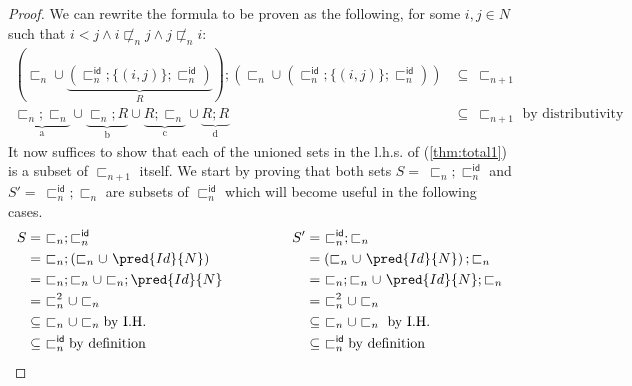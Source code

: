 \begin{lem}
{\begin{proof}
	We can rewrite the formula to be proven as the following, for some $i, j \in N$ such that $i < j \land i \not\sqsubset_n j \land j \not\sqsubset_n i$:
	\begin{align}
		\left( \sqsubset_n \cup \underbrace{\left( \sqsubset_n^\mathsf{id} ; \{ (i, j) \} ; \sqsubset_n^\mathsf{id} \right)}_{R} \right) ; \left( \sqsubset_n \cup \left( \sqsubset_n^\mathsf{id} ; \{ (i, j) \} ; \sqsubset_n^\mathsf{id} \right) \right) &\subseteq\ \sqsubset_{n + 1} \\
		\label{thm:total1}
		\underbrace{\sqsubset_n ; \sqsubset_n}_{\text{a}}
			\cup
		\underbrace{\sqsubset_n ; R}_{\text{b}}
			\cup
		\underbrace{R ; \sqsubset_n}_{\text{c}}
			\cup
		\underbrace{R ; R}_{\text{d}}
			&\subseteq\ \sqsubset_{n + 1} \text{ by distributivity}
	\end{align}
	It now suffices to show that each of the unioned sets in the l.h.s. of (\ref{thm:total1}) is a subset of $\sqsubset_{n + 1}$ itself. We start by proving that both sets $S =\ \sqsubset_n ; \sqsubset_n^\mathsf{id}$ and $S' =\ \sqsubset_n^\mathsf{id} ; \sqsubset_n$ are subsets of $\sqsubset_n^\mathsf{id}$ which will become useful in the following cases.
	\[
		\begin{array}{l @{\hspace{50pt}} l}
			\begin{aligned}
				S  &=\ \sqsubset_n ; \sqsubset_n^\mathsf{id} \\
					&=\ \sqsubset_n ; \left( \sqsubset_n \cup\ \pred{Id}{N} \right) \\
					&=\ \sqsubset_n ; \sqsubset_n \cup \sqsubset_n ; \pred{Id}{N} \\
					&=\ \sqsubset_n^2 \cup \sqsubset_n \\
					&\subseteq\ \sqsubset_n \cup \sqsubset_n \text{by I.H.} \\
					&\subseteq\ \sqsubset_n^\mathsf{id} \text{by definition}
				\end{aligned}
				&
				\begin{aligned}
					S' &=\ \sqsubset_n^\mathsf{id} ; \sqsubset_n \\
					&= \left( \sqsubset_n \cup\ \pred{Id}{N} \right) ; \sqsubset_n \\
					&=\ \sqsubset_n ; \sqsubset_n \cup\ \pred{Id}{N} ; \sqsubset_n \\
					&=\ \sqsubset_n^2 \cup \sqsubset_n \\
					&\subseteq\ \sqsubset_n \cup \sqsubset_n \text{ by I.H.} \\
					&\subseteq\ \sqsubset_n^\mathsf{id} \text{by definition}

\end{aligned}
\end{array}\]
\end{proof}}
\end{lem}
